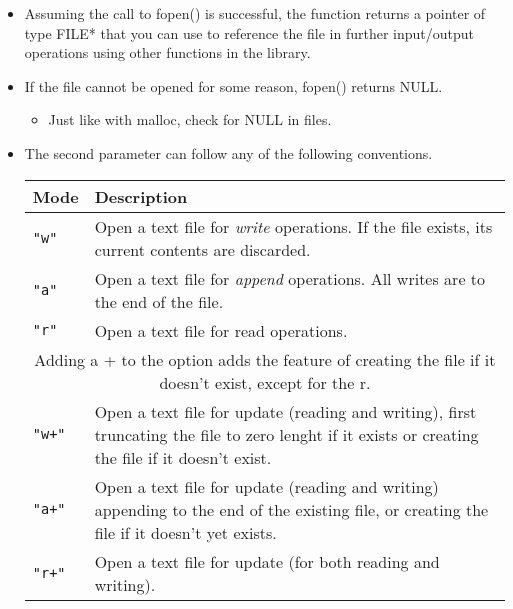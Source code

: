 \begin{itemize}
    \item Assuming the call to fopen() is successful, the function returns a pointer of type FILE* that you can use to reference the file in further input/output operations using other functions in the library.
    \item If the file cannot be opened for some reason, fopen() returns NULL.
        \begin{itemize}
            \item Just like with malloc, check for NULL in files.
        \end{itemize}
    
    \item The second parameter can follow any of the following conventions.
        \begin{center}
            \begin{tabular}{ |p{5cm}|p{10cm}| }
                \hline
                    Mode & Description \\
                \hline
                    \texttt{"w"}   & Open a text file for \emph{write} operations. If the file exists, its current contents are discarded. \\
                \hline 
                    \texttt{"a"}   & Open a text file for \emph{append} operations. All writes are to the end of the file. \\ 
                \hline
                    \texttt{"r"}   & Open a text file for read operations. \\ 
                \hline
                \multicolumn{2}{|c|}{Adding a + to the option adds the feature of creating the file if it doesn't exist, except for the r.} \\
                \hline
                    \texttt{"w+"}  & Open a text file for update (reading and writing), first truncating the file to zero lenght if it exists or creating the file if it doesn't exist. \\ 
                \hline
                    \texttt{"a+"}  & Open a text file for update (reading and writing) appending to the end of the existing file, or creating the file if it doesn't yet exists. \\ 
                \hline
                    \texttt{"r+"}  & Open a text file for update (for both reading and writing). \\ 
                \hline
            \end{tabular}
        \end{center}
\end{itemize}

